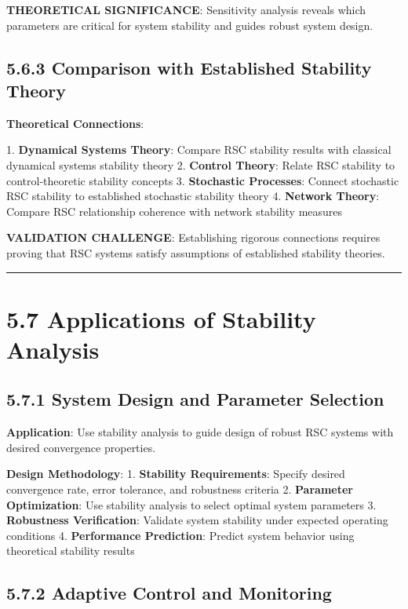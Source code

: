 \textbf{THEORETICAL SIGNIFICANCE}: Sensitivity analysis reveals which parameters are critical for system stability and guides robust system design.

\subsection{5.6.3 Comparison with Established Stability Theory}

\textbf{Theoretical Connections}:

1. \textbf{Dynamical Systems Theory}: Compare RSC stability results with classical dynamical systems stability theory
2. \textbf{Control Theory}: Relate RSC stability to control-theoretic stability concepts
3. \textbf{Stochastic Processes}: Connect stochastic RSC stability to established stochastic stability theory
4. \textbf{Network Theory}: Compare RSC relationship coherence with network stability measures

\textbf{VALIDATION CHALLENGE}: Establishing rigorous connections requires proving that RSC systems satisfy assumptions of established stability theories.

\hrule

\section{5.7 Applications of Stability Analysis}

\subsection{5.7.1 System Design and Parameter Selection}

\textbf{Application}: Use stability analysis to guide design of robust RSC systems with desired convergence properties.

\textbf{Design Methodology}:
1. \textbf{Stability Requirements}: Specify desired convergence rate, error tolerance, and robustness criteria
2. \textbf{Parameter Optimization}: Use stability analysis to select optimal system parameters
3. \textbf{Robustness Verification}: Validate system stability under expected operating conditions
4. \textbf{Performance Prediction}: Predict system behavior using theoretical stability results

\subsection{5.7.2 Adaptive Control and Monitoring}

